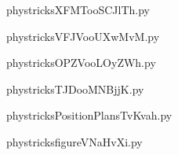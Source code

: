     \newcommand{\CaptionFigXFMTooSCJlTh}{<+Type your caption here+>}
    \begin{center}
        
    \end{center}
    phystricksXFMTooSCJlTh.py

    

    \clearpage
    


    \newcommand{\CaptionFigVFJVooUXwMvM}{<+Type your caption here+>}
    \begin{center}
        
    \end{center}
    phystricksVFJVooUXwMvM.py

    

    \clearpage
    


    \newcommand{\CaptionFigOPZVooLOyZWh}{<+Type your caption here+>}
    \begin{center}
        
    \end{center}
    phystricksOPZVooLOyZWh.py

    

    \clearpage
    


    \newcommand{\CaptionFigTJDooMNBjjK}{<+Type your caption here+>}
    \begin{center}
        
    \end{center}
    phystricksTJDooMNBjjK.py

    

    \clearpage
    


    \newcommand{\CaptionFigPositionPlansTvKvah}{<+Type your caption here+>}
    \begin{center}
        
    \end{center}
    phystricksPositionPlansTvKvah.py

    

    \clearpage
    


    \newcommand{\CaptionFigfigureVNaHvXi}{<+Type your caption here+>}
    \begin{center}
        
    \end{center}
    phystricksfigureVNaHvXi.py


